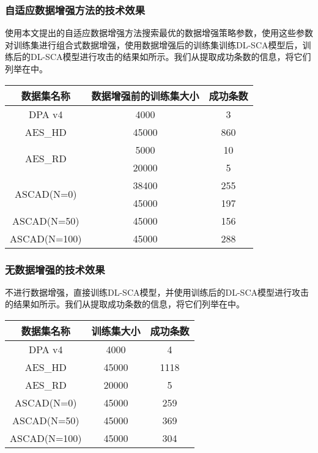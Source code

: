 {	\subsubsection{自适应数据增强方法的技术效果}
	使用本文提出的自适应数据增强方法搜索最优的数据增强策略参数，使用这些参数对训练集进行组合式数据增强，使用数据增强后的训练集训练DL-SCA模型后，训练后的DL-SCA模型进行攻击的结果如所示。我们从提取成功条数的信息，将它们列举在中。
	
	\begin{table}[!h]
		\label{tab:adamtd}
		\centering
		\begin{tabular}{c|cc}
			\hline
			数据集名称&数据增强前的训练集大小&成功条数\\
			\hline
			\hline
			DPA v4    &4000&3\\
			\hline
			AES\_HD   &45000&860\\
			\hline
			\multirow{2}{*}{AES\_RD}
				&5000&10\\
				&20000&5\\
			\hline
			\multirow{2}{*}{ASCAD(N=0)}
				&38400&255\\
				&45000&197\\
			\hline
			ASCAD(N=50)&45000&156\\
			\hline
			ASCAD(N=100)&45000&288\\
			\hline
		\end{tabular}
	\end{table}
	\subsubsection{无数据增强的技术效果}
	不进行数据增强，直接训练DL-SCA模型，并使用训练后的DL-SCA模型进行攻击的结果如所示。我们从提取成功条数的信息，将它们列举在中。
	
	\begin{table}[!h]
		\label{tab:originmtd}
		\centering
		\begin{tabular}{c|cc}
			\hline
			数据集名称&训练集大小&成功条数\\
			\hline
			DPA v4    &4000&4\\
			AES\_HD   &45000&1118\\
			AES\_RD   &20000&5\\
			ASCAD(N=0)&45000&259\\
			ASCAD(N=50)&45000&369\\
			ASCAD(N=100)&45000&304\\
			\hline
		\end{tabular}
	\end{table}

}
